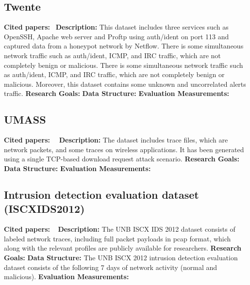 \subsection{Twente}
\textbf{Cited papers:}~\cite{sperotto2009labeled} \newline
\textbf{Description:} This dataset includes three services such as OpenSSH, Apache web server and Proftp using auth/ident on port 113 and captured data from a honeypot network by Netflow. There is some simultaneous network traffic such as auth/ident, ICMP, and IRC traffic, which are not completely benign or malicious. There is some simultaneous network traffic such as auth/ident, ICMP, and IRC traffic, which are not completely benign or malicious. Moreover, this dataset contains some unknown and uncorrelated alerts traffic.\newline
\textbf{Research Goals:}  \newline
\textbf{Data Structure:} \newline
\textbf{Evaluation Measurements:} \newline






\subsection{UMASS}
\textbf{Cited papers:}~\cite{nehinbe2011critical}~\cite{prusty2011forensic} \newline
\textbf{Description:} The dataset includes trace files, which are network packets, and some traces on wireless applications. It has been generated using a single TCP-based download request attack scenario.\newline
\textbf{Research Goals:}  \newline
\textbf{Data Structure:} \newline
\textbf{Evaluation Measurements:} \newline






\subsection{Intrusion detection evaluation dataset (ISCXIDS2012)}
\textbf{Cited papers:} ~\cite{shiravi2012toward}\newline
\textbf{Description:} The UNB ISCX IDS 2012 dataset consists of labeled network traces, including full packet payloads in pcap format, which along with the relevant profiles are publicly available for researchers.  \newline
\textbf{Research Goals:}  \newline
\textbf{Data Structure:} The UNB ISCX 2012 intrusion detection evaluation dataset consists of the following 7 days of network activity (normal and malicious). \newline
\textbf{Evaluation Measurements:} \newline









